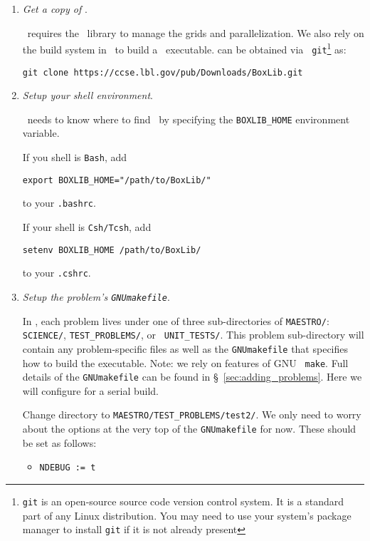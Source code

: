 \begin{enumerate}

\item {\em Get a copy of \boxlib}.

\maestro\ requires the \boxlib\ library to manage the grids and 
parallelization.  We also rely on the build system in \boxlib\ to
build a \maestro\ executable.  \boxlib can be obtained via {\tt
git}\footnote{{\tt git} is an open-source source code version control
system.  It is a standard part of any Linux distribution.  You may
need to use your system's package manager to install {\tt git} if it
is not already present} as:
\begin{verbatim}
git clone https://ccse.lbl.gov/pub/Downloads/BoxLib.git
\end{verbatim}


\item {\em Setup your shell environment}.

\maestro\ needs to know where to find \boxlib\, by specifying the 
{\tt BOXLIB\_HOME} environment variable.  

If you shell is {\tt Bash}, add
\begin{verbatim}
export BOXLIB_HOME="/path/to/BoxLib/"
\end{verbatim}
to your {\tt .bashrc}.  

If your shell is {\tt Csh/Tcsh}, add
\begin{verbatim}
setenv BOXLIB_HOME /path/to/BoxLib/
\end{verbatim}
to your {\tt .cshrc}.  


\item {\em Setup the problem's {\tt GNUmakefile}}.

In \maestro, each problem lives under one of three sub-directories of
{\tt MAESTRO/}: {\tt SCIENCE/}, {\tt TEST\_PROBLEMS/}, or {\tt
UNIT\_TESTS/}.  This problem sub-directory will contain any
problem-specific files as well as the {\tt GNUmakefile} that specifies
how to build the executable.  Note: we rely on features of GNU {\tt
make}.  Full details of the {\tt GNUmakefile} can be found
in \S~\ref{sec:adding_problems}.  Here we will configure for a serial
build.

Change directory to {\tt MAESTRO/TEST\_PROBLEMS/test2/}.    
We only need to worry about the options at the very top of the
{\tt GNUmakefile} for now.  These should be set as follows:
\begin{itemize}
\item {\tt NDEBUG := t}


\end{itemize}
\end{enumerate}
